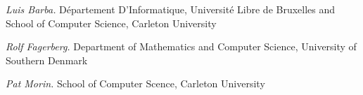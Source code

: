 \documentclass{patmorin}
\begin{document}
\noindent\emph{Luis Barba.}
D\'epartement D'Informatique, Universit\'e Libre de Bruxelles
and
School of Computer Science, Carleton University

\noindent\emph{Rolf Fagerberg.}
Department of Mathematics and Computer Science, University of Southern Denmark

\noindent\emph{Pat Morin.}
School of Computer Scence, Carleton University
\end{document}
